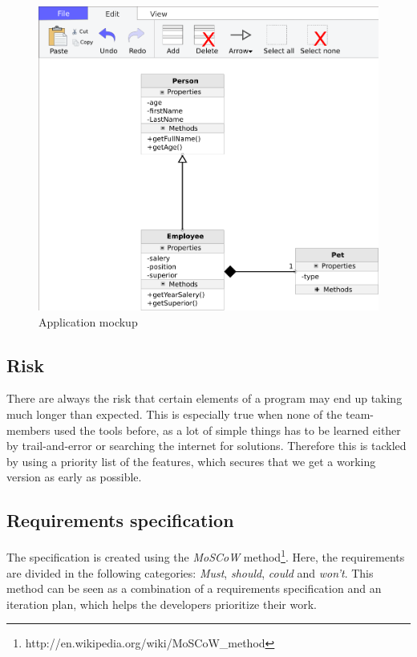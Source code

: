 \begin{figure}[H]
\centering
\includegraphics[width=\linewidth]{img/mockup}
\caption{Application mockup \label{mockup}}
\end{figure}

\subsection{Risk}
There are always the risk that certain elements of a program may end up taking
much longer than expected. This is especially true when none of the team-members
used the tools before, as a lot of simple things has to be learned either by
trail-and-error or searching the internet for solutions. Therefore this is
tackled by using a priority list of the features, which secures that we get a
working version as early as possible.

\newpage
\subsection{Requirements specification}
The specification is created using the \textit{MoSCoW} 
method\footnote{http://en.wikipedia.org/wiki/MoSCoW\_method}. Here, the 
requirements 
are divided in the following categories: \textit{Must}, \textit{should}, 
\textit{could} and \textit{won't}. This method can be seen as a combination of 
a requirements specification and an iteration plan, which helps the developers 
prioritize their work.

